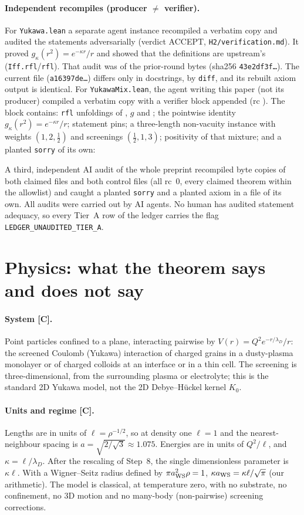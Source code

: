\documentclass[11pt]{article}
\theoremstyle{remark}
\newcommand{\tier}[1]{\textbf{[#1]}}
\begin{document}
\paragraph{Independent recompiles (producer $\ne$ verifier).} For \texttt{Yukawa.lean} a separate agent instance
recompiled a verbatim copy and audited the statements adversarially (verdict ACCEPT, \texttt{H2/verification.md}). It
proved $g_\kappa(r^2)=e^{-\kappa r}/r$ and showed that the definitions are upstream's (\texttt{Iff.rfl}/\texttt{rfl}).
That audit was of the prior-round bytes (sha256 \texttt{43e2df3f\dots}). The current file (\texttt{a16397de\dots})
differs only in docstrings, by \texttt{diff}, and its rebuilt axiom output is identical. For
\texttt{YukawaMix.lean}, the agent writing this paper (not its producer) compiled a verbatim copy with a verifier block
appended (rc \RcVer{}). The block contains: \texttt{rfl} unfoldings of , $g$ and ; the
pointwise identity $g_\kappa(r^2)=e^{-\kappa r}/r$; statement pins; a three-length non-vacuity instance with weights
$(1,2,\tfrac12)$ and screenings $(\tfrac12,1,3)$; positivity of that mixture; and a planted \texttt{sorry} of its own:

A third, independent AI audit of the whole preprint recompiled byte copies of both claimed files and both control files
(all rc~0, every claimed theorem within the allowlist) and caught a planted \texttt{sorry} and a planted axiom in a
file of its own. All audits were carried out by AI agents. No human has audited statement adequacy, so every Tier~A row of the ledger
carries the flag \texttt{LEDGER\_UNAUDITED\_TIER\_A}.

\section{Physics: what the theorem says and does not say}\label{sec:physics}

\paragraph{System \tier{C}.} Point particles confined to a plane, interacting pairwise by $V(r)=Q^2e^{-r/\lambda_D}/r$:
the screened Coulomb (Yukawa) interaction of charged grains in a dusty-plasma monolayer or of charged
colloids at an interface or in a thin cell. The screening is three-dimensional, from the surrounding plasma
or electrolyte; this is the standard 2D Yukawa model, not the 2D Debye--H\"uckel kernel $K_0$.

\paragraph{Units and regime \tier{C}.} Lengths are in units of $\ell=\rho^{-1/2}$, so at density one $\ell=1$ and
the nearest-neighbour spacing is $a=\sqrt{2/\sqrt3}\approx1.075$. Energies are in units of $Q^2/\ell$, and
$\kappa=\ell/\lambda_D$. After the rescaling of Step~8, the single dimensionless parameter is $\kappa\ell$. With a
Wigner--Seitz radius defined by $\pi a_{\rm WS}^2\rho=1$, $\kappa a_{\rm WS}=\kappa\ell/\sqrt\pi$ (our arithmetic). The model is classical, at
temperature zero, with no substrate, no confinement, no 3D motion and no many-body (non-pairwise) screening
corrections.
\end{document}
